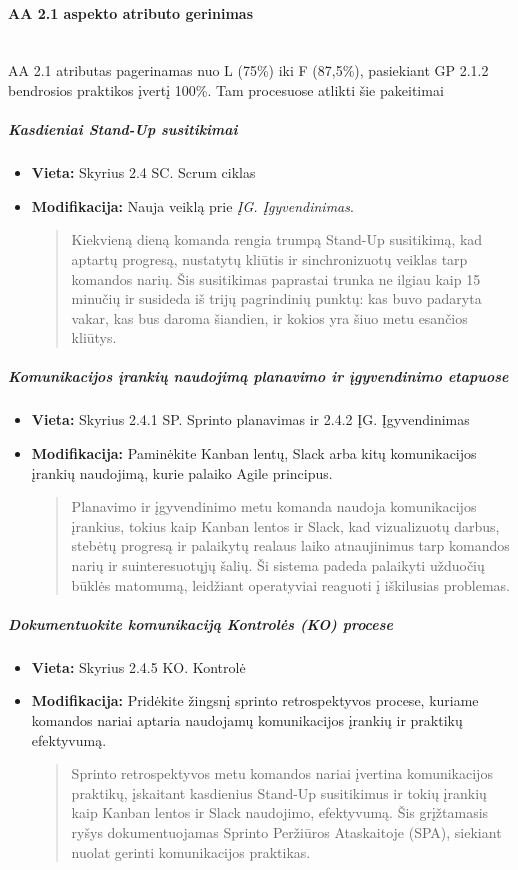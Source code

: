 \documentclass{article}
\newcommand{\subsubsubsection}[1]{\paragraph{#1}\mbox{}\\}
\begin{document}
\subsubsubsection{AA 2.1 aspekto atributo gerinimas}

AA 2.1 atributas pagerinamas nuo L (75\%) iki F (87,5\%), pasiekiant GP 2.1.2 bendrosios praktikos įvertį 100\%. Tam procesuose atlikti šie pakeitimai

\subparagraph{Kasdieniai Stand-Up susitikimai}
\begin{itemize}
    \item \textbf{Vieta:} Skyrius 2.4 SC. Scrum ciklas
    \item \textbf{Modifikacija:} Nauja veiklą prie \textit{ĮG. Įgyvendinimas}.
    \begin{quote}
   Kiekvieną dieną komanda rengia trumpą Stand-Up susitikimą, kad aptartų progresą, nustatytų kliūtis ir sinchronizuotų veiklas tarp komandos narių. Šis susitikimas paprastai trunka ne ilgiau kaip 15 minučių ir susideda iš trijų pagrindinių punktų: kas buvo padaryta vakar, kas bus daroma šiandien, ir kokios yra šiuo metu esančios kliūtys.
    \end{quote}
\end{itemize}


\subparagraph{Komunikacijos įrankių naudojimą planavimo ir įgyvendinimo etapuose}
\begin{itemize}
    \item \textbf{Vieta:} Skyrius 2.4.1 SP. Sprinto planavimas ir 2.4.2 ĮG. Įgyvendinimas
    \item \textbf{Modifikacija:} Paminėkite Kanban lentų, Slack arba kitų komunikacijos įrankių naudojimą, kurie palaiko Agile principus. 
    \begin{quote}
    Planavimo ir įgyvendinimo metu komanda naudoja komunikacijos įrankius, tokius kaip Kanban lentos ir Slack, kad vizualizuotų darbus, stebėtų progresą ir palaikytų realaus laiko atnaujinimus tarp komandos narių ir suinteresuotųjų šalių. Ši sistema padeda palaikyti užduočių būklės matomumą, leidžiant operatyviai reaguoti į iškilusias problemas.
    \end{quote}
\end{itemize}

\subparagraph{Dokumentuokite komunikaciją Kontrolės (KO) procese}
\begin{itemize}
    \item \textbf{Vieta:} Skyrius 2.4.5 KO. Kontrolė
    \item \textbf{Modifikacija:} Pridėkite žingsnį sprinto retrospektyvos procese, kuriame komandos nariai aptaria naudojamų komunikacijos įrankių ir praktikų efektyvumą.
    \begin{quote}
        Sprinto retrospektyvos metu komandos nariai įvertina komunikacijos praktikų, įskaitant kasdienius Stand-Up susitikimus ir tokių įrankių kaip Kanban lentos ir Slack naudojimo, efektyvumą. Šis grįžtamasis ryšys dokumentuojamas Sprinto Peržiūros Ataskaitoje (SPA), siekiant nuolat gerinti komunikacijos praktikas.
    \end{quote}
\end{itemize}
\end{document}
